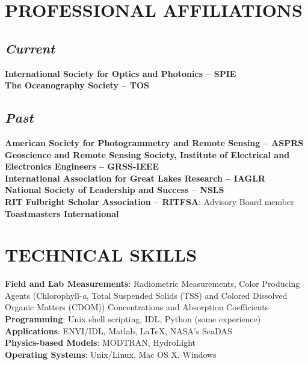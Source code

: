 \documentclass[11pt]{res} %
\begin{document}
\begin{resume}
\section{PROFESSIONAL AFFILIATIONS}
\vspace{-0.1in}
\subsection{\it Current}
\vspace{-0.2in}
{\bf International Society for Optics and Photonics -- SPIE}
\vspace{0.1in}\\
{\bf The Oceanography Society -- TOS}
\vspace{-0.2in}
\subsection{\it Past}
\vspace{-0.2in}
{\bf American Society for Photogrammetry and Remote Sensing -- ASPRS}
\vspace{0.1in}\\
{\bf Geoscience and Remote Sensing Society, Institute of Electrical and Electronics Engineers -- GRSS-IEEE}
\vspace{0.1in}\\
{\bf International Association for Great Lakes Research -- IAGLR}
\vspace{0.1in}\\
{\bf National Society of Leadership and Success -- NSLS}
\vspace{0.1in}\\
{\bf RIT Fulbright Scholar Association -- RITFSA}: Advisory Board member
\vspace{0.1in}\\
{\bf Toastmasters International}

\section{TECHNICAL SKILLS}
\vspace{0.1in}
{\bf Field and Lab Measurements}: Radiometric Measurements, Color Producing Agents (Chlorophyll-{\it a}, Total Suspended Solids (TSS) and Colored Dissolved Organic Matters (CDOM)) Concentrations and Absorption Coefficients
\vspace{0.1in}\\
{\bf Programming}: Unix shell scripting, IDL, Python (some experience)
\vspace{0.1in}\\
{\bf Applications}: ENVI/IDL, Matlab, LaTeX, NASA's SeaDAS
\vspace{0.1in}\\
{\bf Physics-based Models}: MODTRAN, HydroLight
\vspace{0.1in}\\
{\bf Operating Systems}: Unix/Linux, Mac OS X, Windows\\


\end{resume}
\end{document}
